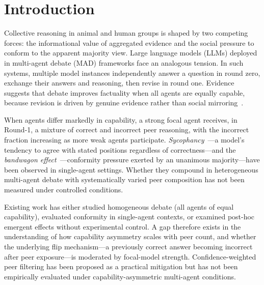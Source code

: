 \documentclass[review,3p,authoryear]{elsarticle}
\begin{document}
\linenumbers

\section{Introduction}
\label{sec:intro}

Collective reasoning in animal and human groups is shaped by two competing
forces: the informational value of aggregated evidence and the social
pressure to conform to the apparent majority view.
Large language models (LLMs) deployed in multi-agent debate (MAD) frameworks
face an analogous tension.
In such systems, multiple model instances independently answer a question in
round zero, exchange their answers and reasoning, then revise in round one.
Evidence suggests that debate improves factuality when all agents are equally
capable, because revision is driven by genuine evidence rather than social
mirroring~\citep{du2023improving}.

When agents differ markedly in capability, a strong focal agent receives,
in Round-1, a mixture of correct and incorrect peer reasoning, with the
incorrect fraction increasing as more weak agents participate.
\textit{Sycophancy}~\citep{sharma2023towards}---a model's tendency to
agree with stated positions regardless of correctness---and the
\textit{bandwagon effect}~\citep{koo2024benchmarking,asch1951effects,bond1996culture}---conformity
pressure exerted by an unanimous majority---have been observed in
single-agent settings.
Whether they compound in heterogeneous multi-agent debate with
systematically varied peer composition has not been measured under
controlled conditions.

Existing work has either studied homogeneous debate (all agents of equal
capability), evaluated conformity in single-agent contexts, or examined
post-hoc emergent effects without experimental control.
A gap therefore exists in the understanding of how capability asymmetry
scales with peer count, and whether the underlying flip mechanism---a
previously correct answer becoming incorrect after peer exposure---is
moderated by focal-model strength.
Confidence-weighted peer filtering has been proposed as a practical
mitigation but has not been empirically evaluated under
capability-asymmetric multi-agent conditions.
\end{document}
